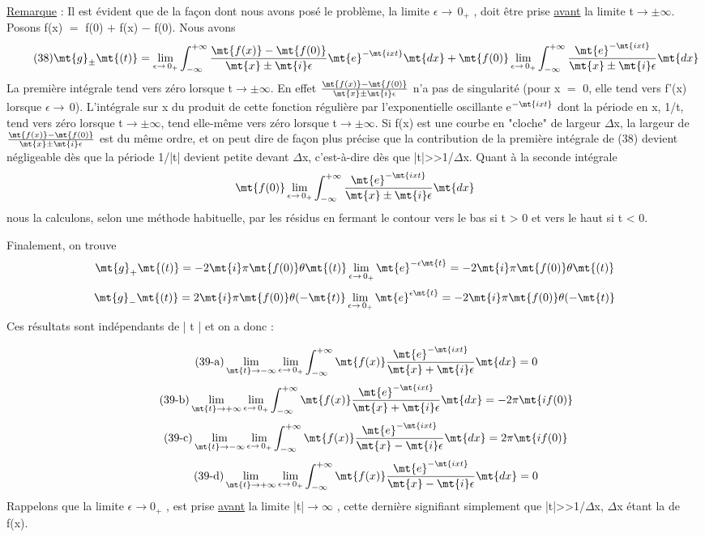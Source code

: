 \ul{Remarque} :
Il est évident que de la façon dont nous avons posé le problème, la limite
$\epsilon\to\,0_+$ , doit être prise \ul{avant} la limite t$\to\pm\infty$.
Posons f(x) $=$ f(0) $+$ f(x) $-$ f(0). Nous avons
\[
\tag{38}\mt{g}_\pm\mt{(t)}=\lim_{\epsilon\to\,0_+}\int_{-\infty}^{+\infty}
\frac{\mt{f(x)}-\mt{f(0)}}{\mt{x}\pm\mt{i}\epsilon}\mt{e}^{-\mt{ixt}}\mt{ dx}+\mt{f(0)}
\lim_{\epsilon\to\,0_+}\int_{-\infty}^{+\infty}
\frac{\mt{e}^{-\mt{ixt}}}{\mt{x}\pm\mt{i}\epsilon}\mt{ dx}
\]
La première intégrale tend vers zéro lorsque t$\to\pm\infty$.
En effet $\frac{\mt{f(x)}-\mt{f(0)}}{\mt{x}\pm\mt{i}\epsilon}$ n'a pas de singularité (pour x $=$ 0, elle tend vers f'(x) lorsque $\epsilon\to\,0$). L'intégrale sur x du produit de cette fonction régulière
par l'exponentielle oscillante e$^{-\mt{ixt}}$ dont la période en x, 1/t, tend vers
zéro lorsque t$\to\pm\infty$, tend elle-même vers zéro lorsque t$\to\pm\infty$. Si f(x) est
une courbe en "cloche" de largeur $\Delta$x, la largeur de $\frac{\mt{f(x)}-\mt{f(0)}}{\mt{x}\pm\mt{i}\epsilon}$ est du même
ordre, et on peut dire de façon plus précise que la contribution de la première
intégrale de (38) devient négligeable dès que la période 1/|t| devient petite
devant $\Delta$x, c'est-à-dire dès que |t|>>1/$\Delta$x.
Quant à la seconde intégrale
\[
\mt{f(0)}\lim_{\epsilon\to\,0_+}\int_{-\infty}^{+\infty}
\frac{\mt{e}^{-\mt{ixt}}}{\mt{x}\pm\mt{i}\epsilon}\mt{ dx}
\]
nous la calculons, selon une méthode habituelle, par les résidus en fermant
le contour vers le bas si t > 0 et vers le haut si t < 0.

Finalement, on trouve
\[
\mt{g}_+\mt{(t)}=-2\mt{i}\pi\mt{ f(0) }\theta\mt{(t)}\lim_{\epsilon\to\,0_+}
\mt{e}^{-\epsilon\mt{t}}=-2\mt{i}\pi\mt{ f(0) }\theta\mt{(t)}
\]
\[
\mt{g}_-\mt{(t)}=2\mt{i}\pi\mt{ f(0) }\theta(-\mt{t)}\lim_{\epsilon\to\,0_+}
\mt{e}^{\epsilon\mt{t}}=-2\mt{i}\pi\mt{ f(0) }\theta(-\mt{t)}
\]
Ces résultats sont indépendants de | t | et on a donc :

\[
\tag{39-a}\lim_{\mt{t}\to-\infty}\lim_{\epsilon\to\,0_+}
\int_{-\infty}^{+\infty}\mt{f(x) }
\frac{\mt{e}^{-\mt{ixt}}}{\mt{x}+\mt{i}\epsilon}\mt{ dx}=0
\]
\[
\tag{39-b}\lim_{\mt{t}\to+\infty}\lim_{\epsilon\to\,0_+}
\int_{-\infty}^{+\infty}\mt{f(x) }
\frac{\mt{e}^{-\mt{ixt}}}{\mt{x}+\mt{i}\epsilon}\mt{ dx}=-2\pi\mt{if(0)}
\]
\[
\tag{39-c}\lim_{\mt{t}\to-\infty}\lim_{\epsilon\to\,0_+}
\int_{-\infty}^{+\infty}\mt{f(x) }
\frac{\mt{e}^{-\mt{ixt}}}{\mt{x}-\mt{i}\epsilon}\mt{ dx}=2\pi\mt{if(0)}
\]
\[
\tag{39-d}\lim_{\mt{t}\to+\infty}\lim_{\epsilon\to\,0_+}
\int_{-\infty}^{+\infty}\mt{f(x) }
\frac{\mt{e}^{-\mt{ixt}}}{\mt{x}-\mt{i}\epsilon}\mt{ dx}=0
\]
Rappelons que la limite $\epsilon\to0_+$ , est prise \ul{avant} la limite |t|$\to\infty$ , cette
dernière signifiant simplement que |t|>>1/$\Delta$x, $\Delta$x étant la  de f(x).
